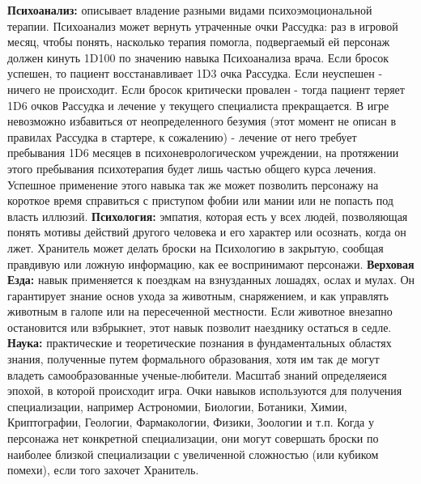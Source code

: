\documentclass[letterpaper,twocolumn,openany, twoside, 11pt, usenames]{cocbook}
\begin{document}
\begin{fullcocpaperbox}{}{}
  \begin{multicols}{3}
  \textbf{Психоанализ:} описывает владение разными видами психоэмоциональной терапии. Психоанализ может вернуть утраченные очки Рассудка: раз в игровой месяц, чтобы понять, насколько терапия помогла, подвергаемый ей персонаж должен кинуть 1D100 по значению навыка Психоанализа врача. Если бросок успешен, то пациент восстанавливает 1D3 очка Рассудка. Если неуспешен - ничего не происходит. Если бросок критически провален - тогда пациент теряет 1D6 очков Рассудка и лечение у текущего специалиста прекращается. В игре невозможно избавиться от неопределенного безумия (этот момент не описан в правилах Рассудка в стартере, к сожалению) - лечение от него требует пребывания 1D6 месяцев в психоневрологическом учреждении, на протяжении этого пребывания психотерапия будет лишь частью общего курса лечения. Успешное применение этого навыка так же может позволить персонажу на короткое время справиться с приступом фобии или мании или не попасть под власть иллюзий.
  \smallbreak
  \textbf{Психология:} эмпатия, которая есть у всех людей, позволяющая понять мотивы действий другого человека и его характер или осознать, когда он лжет. Хранитель может делать броски на Психологию в закрытую, сообщая правдивую или ложную информацию, как ее воспринимают персонажи.
  \smallbreak
  \textbf{Верховая Езда:} навык применяется к поездкам на взнузданных лошадях, ослах и мулах. Он гарантирует знание основ ухода за животным, снаряжением, и как управлять животным в галопе или на пересеченной местности. Если животное внезапно остановится или взбрыкнет, этот навык позволит наезднику остаться в седле.
  \smallbreak
  \textbf{Наука:} практические и теоретические познания в фундаментальных областях знания, полученные путем формального образования, хотя им так де могут владеть самообразованные ученые-любители. Масштаб знаний определяеися эпохой, в которой происходит игра. Очки навыков используются для получения специализации, например Астрономии, Биологии, Ботаники, Химии, Криптографии, Геологии, Фармакологии, Физики, Зоологии и т.п. Когда у персонажа нет конкретной специализации, они могут совершать броски по наиболее близкой специализации с увеличенной сложностью (или кубиком помехи), если того захочет Хранитель.

\end{multicols}
\end{fullcocpaperbox}
\end{document}
